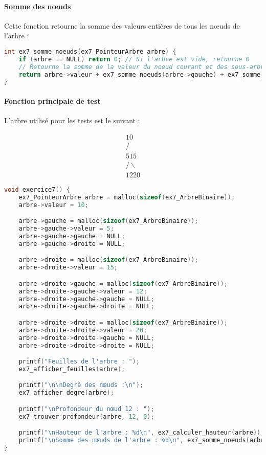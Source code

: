 \documentclass[a4paper,12pt]{article}
\begin{document}
\paragraph{Somme des nœuds}

Cette fonction retourne la somme des valeurs entières de tous les nœuds de l’arbre :

\begin{lstlisting}[language=C, caption={Somme des valeurs}]
int ex7_somme_noeuds(ex7_PointeurArbre arbre) {
    if (arbre == NULL) return 0; // Si l'arbre est vide, retourne 0
    // Retourne la somme de la valeur du noeud courant et des sous-arbres gauche et droit
    return arbre->valeur + ex7_somme_noeuds(arbre->gauche) + ex7_somme_noeuds(arbre->droite);
}

\end{lstlisting}

\paragraph{Fonction principale de test}

L’arbre utilisé pour les tests est le suivant :

\[
\begin{array}{c}
      10 \\
     /  \\
    5    15 \\
        /  \backslash \\
       12   20
\end{array}
\]

\begin{lstlisting}[language=C, caption={Programme principal}]
void exercice7() {
    ex7_PointeurArbre arbre = malloc(sizeof(ex7_ArbreBinaire));
    arbre->valeur = 10;

    arbre->gauche = malloc(sizeof(ex7_ArbreBinaire));
    arbre->gauche->valeur = 5;
    arbre->gauche->gauche = NULL;
    arbre->gauche->droite = NULL;

    arbre->droite = malloc(sizeof(ex7_ArbreBinaire));
    arbre->droite->valeur = 15;

    arbre->droite->gauche = malloc(sizeof(ex7_ArbreBinaire));
    arbre->droite->gauche->valeur = 12;
    arbre->droite->gauche->gauche = NULL;
    arbre->droite->gauche->droite = NULL;

    arbre->droite->droite = malloc(sizeof(ex7_ArbreBinaire));
    arbre->droite->droite->valeur = 20;
    arbre->droite->droite->gauche = NULL;
    arbre->droite->droite->droite = NULL;

    printf("Feuilles de l'arbre : ");
    ex7_afficher_feuilles(arbre);

    printf("\n\nDegré des nœuds :\n");
    ex7_afficher_degre(arbre);

    printf("\nProfondeur du nœud 12 : ");
    ex7_trouver_profondeur(arbre, 12, 0);

    printf("\nHauteur de l'arbre : %d\n", ex7_calculer_hauteur(arbre));
    printf("\nSomme des nœuds de l'arbre : %d\n", ex7_somme_noeuds(arbre));
}
\end{lstlisting}
\end{document}
